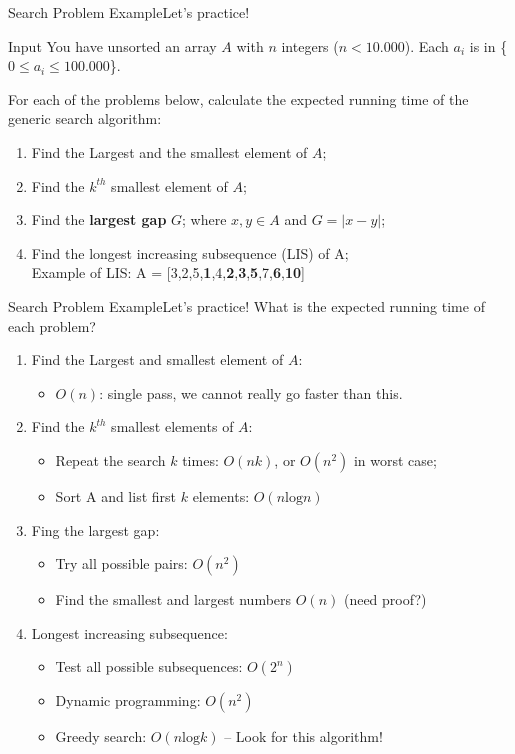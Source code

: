 \begin{frame}{Search Problem Example}{Let's practice!}

  \begin{block}{Input}
    You have unsorted an array $A$ with $n$ integers ($n < 10.000$). Each $a_i$ is in \{$0 \leq a_i \leq 100.000$\}.
  \end{block}\bigskip

  For each of the problems below, calculate the expected running time of the generic search algorithm:
  \begin{enumerate}
  \item Find the Largest and the smallest element of $A$;
  \item Find the $k^{th}$ smallest element of $A$;
  \item Find the {\bf largest gap} $G$; where $x,y \in A$ and $G = |x-y|$;
  \item Find the longest increasing subsequence (LIS) of A;\\
    \hfill Example of LIS: A = [3,2,5,{\bf 1},4,{\bf 2},{\bf 3},{\bf 5},7,{\bf 6},{\bf 10}]
  \end{enumerate}
\end{frame}

\begin{frame}{Search Problem Example}{Let's practice!}
  What is the expected running time of each problem?
  \begin{enumerate}
  \item Find the Largest and smallest element of $A$:
    \begin{itemize}
      \item $O(n)$: single pass, we cannot really go faster than this.
    \end{itemize}
  \item Find the $k^{th}$ smallest elements of $A$:
    \begin{itemize}
      \item Repeat the search $k$ times: $O(nk)$, or $O(n^2)$ in worst case;
      \item Sort A and list first $k$ elements: $O(n\text{log}n)$
    \end{itemize}
  \item Fing the largest gap:
    \begin{itemize}
    \item Try all possible pairs: $O(n^2)$
    \item Find the smallest and largest numbers $O(n)$ (need proof?)
    \end{itemize}
  \item Longest increasing subsequence:
    \begin{itemize}
    \item Test all possible subsequences: $O(2^n)$
    \item Dynamic programming: $O(n^2)$
    \item Greedy search: $O(n\text{log}k)$ -- Look for this algorithm!
    \end{itemize}
  \end{enumerate}
\end{frame}

